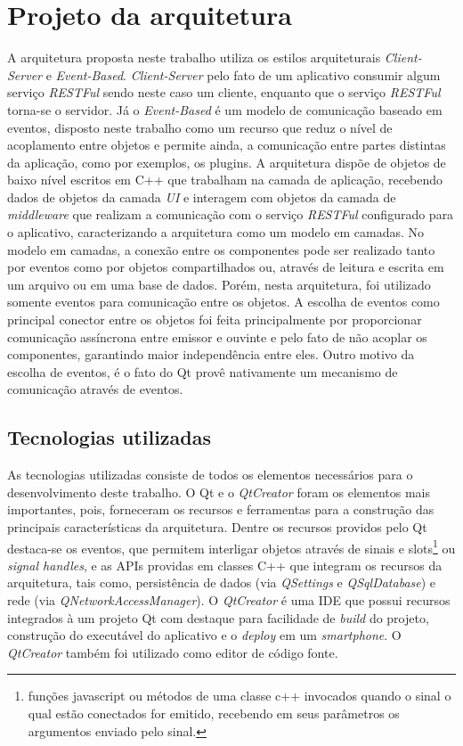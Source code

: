 \section{Projeto da arquitetura}
A arquitetura proposta neste trabalho utiliza os estilos arquiteturais \textit{Client-Server} e \textit{Event-Based}. \textit{Client-Server} pelo fato de um aplicativo consumir algum serviço \textit{RESTFul} sendo neste caso um cliente, enquanto que o serviço \textit{RESTFul} torna-se o servidor. Já o \textit{Event-Based} é um modelo de comunicação baseado em eventos, disposto neste trabalho como um recurso que reduz o nível de acoplamento entre objetos e permite ainda, a comunicação entre partes distintas da aplicação, como por exemplos, os plugins. A arquitetura dispõe de objetos de baixo nível escritos em C++ que trabalham na camada de aplicação, recebendo dados de objetos da camada \textit{UI} e interagem com objetos da camada de \textit{middleware} que realizam a comunicação com o serviço \textit{RESTFul} configurado para o aplicativo, caracterizando a arquitetura como um modelo em camadas. No modelo em camadas, a conexão entre os componentes pode ser realizado tanto por eventos como por objetos compartilhados ou, através de leitura e escrita em um arquivo ou em uma base de dados. Porém, nesta arquitetura, foi utilizado somente eventos para comunicação entre os objetos. A escolha de eventos como principal conector entre os objetos foi feita principalmente por proporcionar comunicação assíncrona entre emissor e ouvinte e pelo fato de não acoplar os componentes, garantindo maior independência entre eles. Outro motivo da escolha de eventos, é o fato do Qt provê nativamente um mecanismo de comunicação através de eventos.\par


\subsection{Tecnologias utilizadas}
As tecnologias utilizadas consiste de todos os elementos necessários para o desenvolvimento deste trabalho. O Qt e o \textit{QtCreator} foram os elementos mais importantes, pois, forneceram os recursos e ferramentas para a construção das principais características da arquitetura. Dentre os recursos providos pelo Qt destaca-se os eventos, que permitem interligar objetos através de sinais e slots\footnote{funções javascript ou métodos de uma classe c++ invocados quando o sinal o qual estão conectados for emitido, recebendo em seus parâmetros os argumentos enviado pelo sinal.} ou \textit{signal handles}, e as APIs providas em classes C++ que integram os recursos da arquitetura, tais como, persistência de dados (via \textit{QSettings} e \textit{QSqlDatabase}) e rede (via \textit{QNetworkAccessManager}). O \textit{QtCreator} é uma IDE que possui recursos integrados à um projeto Qt com destaque para facilidade de \textit{build} do projeto, construção do executável do aplicativo e o \textit{deploy} em um \textit{smartphone}. O \textit{QtCreator} também foi utilizado como editor de código fonte.


